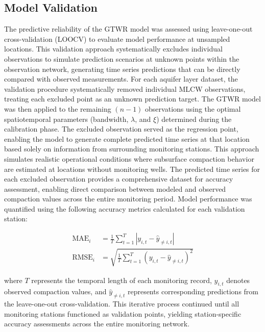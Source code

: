 

\subsection{Model Validation}
\label{subsec:gtwr_validation}

The predictive reliability of the GTWR model was assessed using leave-one-out cross-validation (LOOCV) to evaluate model performance at unsampled locations. This validation approach systematically excludes individual observations to simulate prediction scenarios at unknown points within the observation network, generating time series predictions that can be directly compared with observed measurements.
%
For each aquifer layer dataset, the validation procedure systematically removed individual MLCW observations, treating each excluded point as an unknown prediction target. The GTWR model was then applied to the remaining $(n-1)$ observations using the optimal spatiotemporal parameters (bandwidth, $\lambda$, and $\xi$) determined during the calibration phase. The excluded observation served as the regression point, enabling the model to generate complete predicted time series at that location based solely on information from surrounding monitoring stations.
%
This approach simulates realistic operational conditions where subsurface compaction behavior are estimated at locations without monitoring wells. The predicted time series for each excluded observation provides a comprehensive dataset for accuracy assessment, enabling direct comparison between modeled and observed compaction values across the entire monitoring period.
%
Model performance was quantified using the following accuracy metrics calculated for each validation station:

\begin{align}
	\text{MAE}_i &= \frac{1}{T}\sum_{t=1}^{T} |y_{i,t} - \hat{y}_{\neq i,t}| \label{eq:mae_station}\\
	\text{RMSE}_i &= \sqrt{\frac{1}{T}\sum_{t=1}^{T} (y_{i,t} - \hat{y}_{\neq i,t})^2} \label{eq:rmse_station}
\end{align}

\noindent where $T$ represents the temporal length of each monitoring record, $y_{i,t}$ denotes observed compaction values, and $\hat{y}_{\neq i,t}$ represents corresponding predictions from the leave-one-out cross-validation.
%
This iterative process continued until all monitoring stations functioned as validation points, yielding station-specific accuracy assessments across the entire monitoring network.

